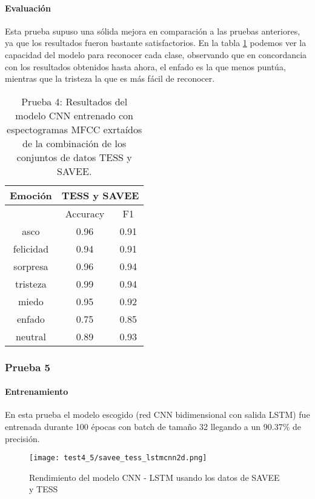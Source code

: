 \documentclass[11pt,a4paper,spanish]{book}
\begin{document}
	\paragraph{Evaluación}
	Esta prueba supuso una sólida mejora en comparación a las pruebas anteriores, ya que los resultados fueron bastante satisfactorios. En la tabla \ref{result_Test4} podemos ver la capacidad del modelo para reconocer cada clase, observando que en concordancia con los resultados obtenidos hasta ahora, el enfado es la que menos puntúa, mientras que la tristeza la que es más fácil de reconocer.
	\begin{table}[H]
		\centering
		\begin{center}
			\begin{tabular}{| c|| c c | }
				\hline
				\multicolumn{1}{|c||}{Emoción} & 
				\multicolumn{2}{|c|}{TESS y SAVEE} \\
				\hline
				& 
				\multicolumn{1}{|c|}{Accuracy}&\multicolumn{1}{|c|}{F1}\\
				\hline
				asco 		&  0.96 &  0.91 \\
				felicidad 	&  0.94 &  0.91 \\
				sorpresa 	&  0.96 &  0.94 \\
				tristeza 	&  0.99 &  0.94 \\
				miedo 		&  0.95 &  0.92 \\
				enfado 		&  0.75 &  0.85 \\
				neutral 	&  0.89 &  0.93 \\
				\hline
			\end{tabular}
			
			\caption{Prueba 4: Resultados del modelo CNN entrenado con espectogramas MFCC exrtaídos de la combinación de los conjuntos de datos TESS y SAVEE.}
			\label{result_Test4}
		\end{center}
	\end{table}
	
	\subsubsection{Prueba 5}
	\paragraph{Entrenamiento}
	En esta prueba el modelo escogido (red CNN bidimensional con salida LSTM) fue entrenada durante 100 épocas con batch de tamaño 32 llegando a un 90.37\% de precisión. 
	\begin{figure}[H]
		\centering
		\texttt{[image: test4\_5/savee\_tess\_lstmcnn2d.png]} 
		\caption{Rendimiento del modelo CNN - LSTM usando los datos de SAVEE y TESS}
		\label{fig:lstm-cnn}
	\end{figure}
\end{document}
